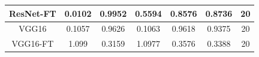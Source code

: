 \documentclass[11pt,a4paper]{article}
\theoremstyle{definition}
\begin{document}
\begin{table}[H]
\begin{tabular}{|c|c|c|c|c|c|c|}
\hline
ResNet-FT                                           & \textcolor[rgb]{0.129,0.129,0.129}{0.0102 } & \textcolor[rgb]{0.129,0.129,0.129}{0.9952 } & \textcolor[rgb]{0.129,0.129,0.129}{0.5594 }                                                                       & \textcolor[rgb]{0.129,0.129,0.129}{0.8576}                                                                             & \textcolor[rgb]{0.129,0.129,0.129}{0.8736}                                                                       & 20                                                                                                              \\
\hline
VGG16                                               & \textcolor[rgb]{0.129,0.129,0.129}{0.1057 } & \textcolor[rgb]{0.129,0.129,0.129}{0.9626 } & \textcolor[rgb]{0.129,0.129,0.129}{0.1063 }                                                                       & \textcolor[rgb]{0.129,0.129,0.129}{0.9618}                                                                             & \textcolor[rgb]{0.129,0.129,0.129}{0.9375}                                                                       & 20                                                                                                              \\
\hline
\rowcolor{green} VGG16-FT                           & \textcolor[rgb]{0.129,0.129,0.129}{1.099}   & \textcolor[rgb]{0.129,0.129,0.129}{0.3159 } & \textcolor[rgb]{0.129,0.129,0.129}{1.0977 }                                                                       & \textcolor[rgb]{0.129,0.129,0.129}{0.3576}                                                                             & \textcolor[rgb]{0.129,0.129,0.129}{0.3388}                                                                       & 20                                                                                                              \\
\hline
\end{tabular}
\end{table}
\end{document}
